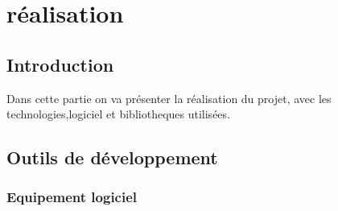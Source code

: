 \documentclass{article}
\begin{document}
    \section{réalisation}
        \subsection{Introduction}
            Dans cette partie on va présenter la réalisation du projet, avec les technologies,logiciel et bibliotheques utilisées.
        
        \subsection{Outils de développement}
            
            \subsubsection{Equipement logiciel}
        
\end{document}
